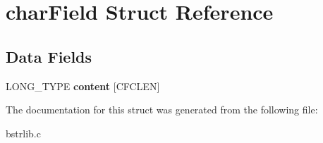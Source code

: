 \hypertarget{structcharField}{}\section{char\+Field Struct Reference}
\label{structcharField}
\subsection*{Data Fields}
\begin{DoxyCompactItemize}
\item 
\hypertarget{structcharField_a8f9248fefe062f32178d961d330454a1}{}L\+O\+N\+G\+\_\+\+T\+Y\+P\+E {\bfseries content} \mbox{[}C\+F\+C\+L\+E\+N\mbox{]}\label{structcharField_a8f9248fefe062f32178d961d330454a1}

\end{DoxyCompactItemize}


The documentation for this struct was generated from the following file\+:\begin{DoxyCompactItemize}
\item 
bstrlib.\+c\end{DoxyCompactItemize}
